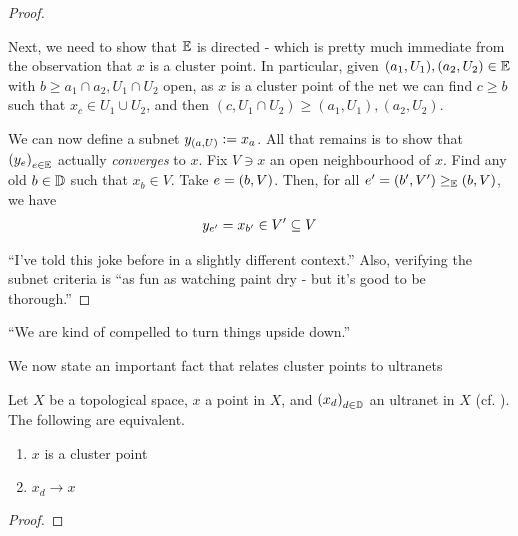 \begin{proof}
\begin{description}
        Next, we need to show that $\mathbb{E}$ is directed - which is pretty much immediate from the observation that $x$ is a cluster point. In particular, given $(a_1, U_1), (a_2, U_2)\in \mathbb{E}$ with $b\geq a_1\cap a_2, U_1\cap U_2$ open, as $x$ is a cluster point of the net we can find $c\geq b$ such that $x_c\in U_1\cup U_2$, and then $(c, U_1\cap U_2)\geq (a_1, U_1), (a_2, U_2)$.

        We can now define a subnet $y_{\left( a, U \right)} := x_a$. All that remains is to show that $\left( y_e \right)_{e \in \mathbb{E}}$ actually \textit{converges} to $x$. Fix $V \ni x$ an open neighbourhood of $x$. Find any old $b \in \mathbb{D}$ such that $x_b \in V$. Take $e = \left( b, V \right)$. Then, for all $e' = \left( b', V' \right) \geq_{\mathbb{E}} \left( b, V \right)$, we have
        \begin{align*}
            y_{e'} = x_{b'} \in V' \subseteq V
        \end{align*}

    \end{description}``I've told this joke before in a slightly different context.'' Also, verifying the subnet criteria is
    ``as fun as watching paint dry - but it's good to be thorough.''
\end{proof}
``We are kind of compelled to turn things upside down.''

We now state an important fact that relates cluster points to ultranets

\begin{boxproposition}
    Let $X$ be a topological space, $x$ a point in $X$, and $\left( x_d \right)_{d \in \mathbb{D}}$ an ultranet in $X$ (cf. ). The following are equivalent.
    \begin{enumerate}[label = (\arabic*)]
        \item $x$ is a cluster point
        \item $x_d \to x$
    \end{enumerate}
\end{boxproposition}
\begin{proof}
    \sorry
\end{proof}